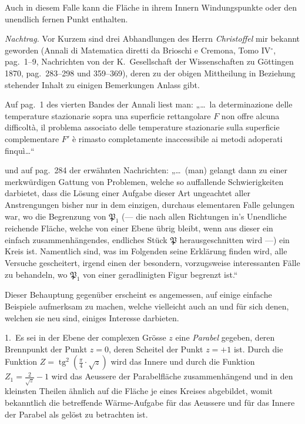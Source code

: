 \documentclass{article}
\begin{document}
Auch in diesem Falle kann die Fläche in ihrem Innern Windungspunkte oder den unendlich fernen Punkt enthalten.

\emph{Nachtrag.} Vor Kurzem sind drei Abhandlungen des Herrn \emph{Christoffel} mir bekannt geworden (Annali di Matematica diretti da Brioschi e Cremona, Tomo IV${}^\circ$, pag.~1--9, Nachrichten von der K.~Gesellschaft der Wissenschaften zu Göttingen 1870, pag.~283--298 und 359--369), deren zu der obigen Mittheilung in Beziehung stehender Inhalt zu einigen Bemerkungen Anlass gibt.

Auf pag.~1 des vierten Bandes der Annali liest man: „\dots\ la determinazione delle temperature stazionarie sopra una superficie rettangolare $F$ non offre alcuna difficoltà, il problema associato delle temperature stazionarie sulla superficie complementare $F'$ è rimasto completamente inaccessibile ai metodi adoperati finquì\dots“

und auf pag.~284 der erwähnten Nachrichten: „\dots\ (man) gelangt dann zu einer merkwürdigen Gattung von Problemen, welche so auffallende Schwierigkeiten darbietet, dass die Lösung einer Aufgabe dieser Art ungeachtet aller Anstrengungen bisher nur in dem einzigen, durchaus elementaren Falle gelungen war, wo die Begrenzung von $\mathfrak{P}_1$ (--- die nach allen Richtungen in's Unendliche reichende Fläche, welche von einer Ebene übrig bleibt, wenn aus dieser
ein einfach zusammenhängendes, endliches Stück $\mathfrak{P}$ herausgeschnitten wird ---) ein Kreis ist. Namentlich sind, was im Folgenden seine Erklärung finden wird, alle Versuche gescheitert, irgend einen der besondern, vorzugsweise interessanten Fälle zu behandeln, wo $\mathfrak{P}_1$ von einer geradlinigten Figur begrenzt ist.“

Dieser Behauptung gegenüber erscheint es angemessen, auf einige einfache Beispiele aufmerksam zu machen, welche vielleicht auch an und für sich denen, welchen sie neu sind, einiges Interesse darbieten.

1.~Es sei in der Ebene der complexen Grösse $z$ eine \emph{Parabel} gegeben, deren Brennpunkt der Punkt $z = 0$, deren Scheitel der Punkt $z = +1$ ist. Durch die Funktion $Z = \operatorname{tg}^2\!\left(\frac{\pi}{4} \cdot \sqrt{z}\right)$ wird das Innere und durch die Funktion $Z_1 = \frac{2}{\sqrt{z}} - 1$ wird das Aeussere der Parabelfläche zusammenhängend und in den kleinsten Theilen ähnlich auf die Fläche je eines Kreises abgebildet, womit bekanntlich die betreffende Wärme-Aufgabe für das Aeussere und für das Innere der Parabel als gelöst zu betrachten ist.
\end{document}
